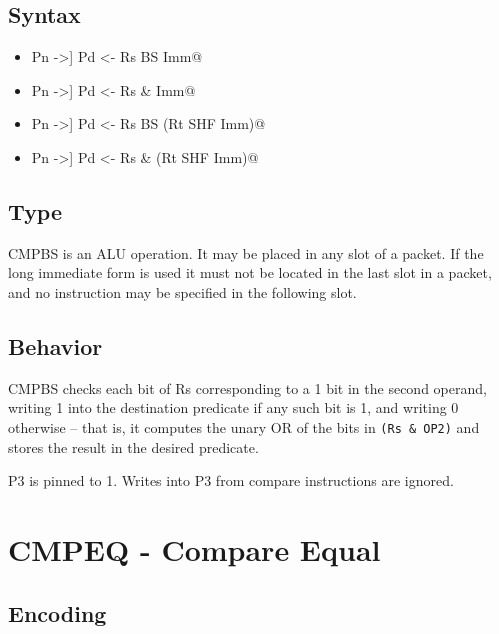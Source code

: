 \documentclass[11pt,openany]{report}
\begin{document}
\subsection{Syntax}

\begin{itemize}
  \item \verb@[[!]Pn ->] Pd <- Rs BS Imm@
  \item \verb@[[!]Pn ->] Pd <- Rs & Imm@
  \item \verb@[[!]Pn ->] Pd <- Rs BS (Rt SHF Imm)@
  \item \verb@[[!]Pn ->] Pd <- Rs & (Rt SHF Imm)@
\end{itemize}

\subsection{Type}
CMPBS is an ALU operation. It may be placed in any slot of a packet. If the long immediate form is used it must not be located in the last slot in a packet, and no instruction may be specified in the following slot.

\subsection{Behavior}
CMPBS checks each bit of Rs corresponding to a 1 bit in the second operand, writing 1 into the destination predicate if any such bit is 1, and writing 0 otherwise  -- that is, it computes the unary OR of the bits in \verb!(Rs & OP2)! and stores the result in the desired predicate.

\noindent
P3 is pinned to 1. Writes into P3 from compare instructions are ignored.

\pagebreak
\section{CMPEQ - Compare Equal}
\label{sec:cmpeqinst}

\subsection{Encoding}
\end{document}
